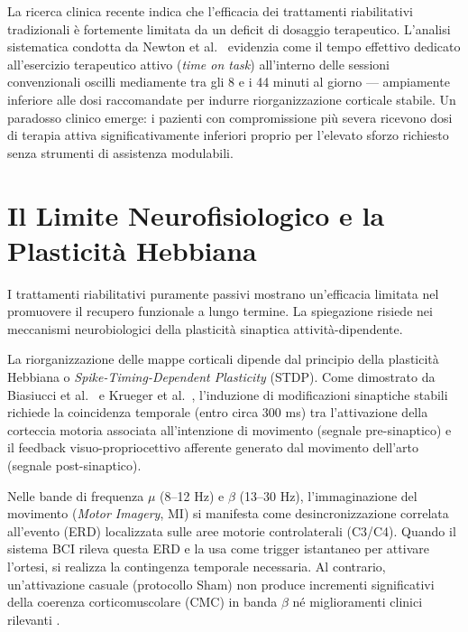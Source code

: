 \documentclass[a4paper,11pt]{article}
\begin{document}
La ricerca clinica recente indica che l'efficacia dei trattamenti riabilitativi
tradizionali è fortemente limitata da un deficit di dosaggio terapeutico.
L'analisi sistematica condotta da Newton et al.\ \cite{newton2023dose} evidenzia
come il tempo effettivo dedicato all'esercizio terapeutico attivo (\textit{time on task})
all'interno delle sessioni convenzionali oscilli mediamente tra gli 8 e i 44 minuti
al giorno — ampiamente inferiore alle dosi raccomandate per indurre riorganizzazione
corticale stabile. Un paradosso clinico emerge: i pazienti con compromissione più
severa ricevono dosi di terapia attiva significativamente inferiori proprio per
l'elevato sforzo richiesto senza strumenti di assistenza modulabili.

\section{Il Limite Neurofisiologico e la Plasticità Hebbiana}
I trattamenti riabilitativi puramente passivi mostrano un'efficacia limitata nel
promuovere il recupero funzionale a lungo termine. La spiegazione risiede nei
meccanismi neurobiologici della plasticità sinaptica attività-dipendente.

La riorganizzazione delle mappe corticali dipende dal principio della plasticità
Hebbiana o \textit{Spike-Timing-Dependent Plasticity} (STDP). Come dimostrato da
Biasiucci et al.\ \cite{biasiucci2018brain} e Krueger et al.\ \cite{krueger2024hebbian},
l'induzione di modificazioni sinaptiche stabili richiede la coincidenza temporale
(entro circa 300 ms) tra l'attivazione della corteccia motoria associata all'intenzione
di movimento (segnale pre-sinaptico) e il feedback visuo-propriocettivo afferente
generato dal movimento dell'arto (segnale post-sinaptico).

Nelle bande di frequenza $\mu$ (8--12 Hz) e $\beta$ (13--30 Hz), l'immaginazione
del movimento (\textit{Motor Imagery}, MI) si manifesta come desincronizzazione
correlata all'evento (ERD) localizzata sulle aree motorie controlaterali (C3/C4).
Quando il sistema BCI rileva questa ERD e la usa come trigger istantaneo per
attivare l'ortesi, si realizza la contingenza temporale necessaria. Al contrario,
un'attivazione casuale (protocollo Sham) non produce incrementi significativi
della coerenza corticomuscolare (CMC) in banda $\beta$ \cite{krueger2024hebbian}
né miglioramenti clinici rilevanti \cite{kim2025efficacy}.
\end{document}
